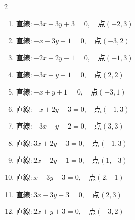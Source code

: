 \begin{multicols}{2}
\begin{enumerate}
\resetques

  \item $直線:-3x+3y+3=0,\quad 点 ( -2, 3 )$


  \item $直線:-x-3y+1=0,\quad 点 ( -3, 2 )$


  \item $直線:-2x-2y-1=0,\quad 点 ( -1, 3 )$


  \item $直線:-3x+y-1=0,\quad 点 ( 2, 2 )$


  \item $直線:-x+y+1=0,\quad 点 ( -3, 1 )$


  \item $直線:-x+2y-3=0,\quad 点 ( -1, 3 )$


  \item $直線:-3x-y-2=0,\quad 点 ( 3, 3 )$


  \item $直線:3x+2y+3=0,\quad 点 ( -1, 3 )$


  \item $直線:2x-2y-1=0,\quad 点 ( 1, -3 )$


  \item $直線:x+3y-3=0,\quad 点 ( 2, -1 )$


\columnbreak %

  \item $直線:3x-3y+3=0,\quad 点 ( 2, 3 )$

        \phantom{$\displaystyle 距離 : 0$}

  \item $直線:2x+y+3=0,\quad 点 ( -3, 2 )$


\end{enumerate}
\end{multicols}
